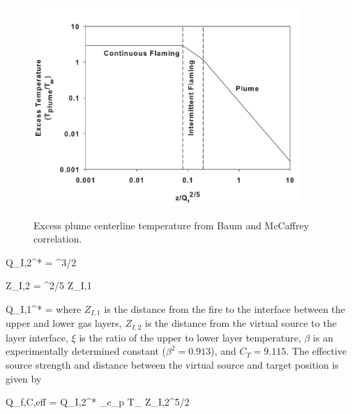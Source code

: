 \begin{figure}
\begin{center}
\includegraphics[width=4.0in]{FIGURES/Theory/Plume_Temperature}\\
\end{center}
\caption{Excess plume centerline temperature from Baum and McCaffrey correlation.}
 \label{fig:Plume_Temp}
\end{figure}

\be Q_{I,2}^* = ^{3/2} \ee

\be Z_{I,2} = ^{2/5} Z_{I,1}  \ee

\be Q_{I,1}^* =   \ee
where $Z_{I,1}$ is the distance from the fire to the interface between the upper and lower gas layers, $Z_{I,2}$ is the distance from the virtual source to the layer interface, $\xi$ is the ratio of the upper to lower layer temperature, $\beta$ is an experimentally determined constant \cite{Zukoski:1981} ($\beta^2 = 0.913$), and $C_T = 9.115$.  The effective source strength and distance between the virtual source and target position is given by

\be Q_{f,C,eff} = Q_{I,2}^* \rho_\infty c_{p\infty} T_\infty {} Z_{I,2}^{5/2}  \ee

